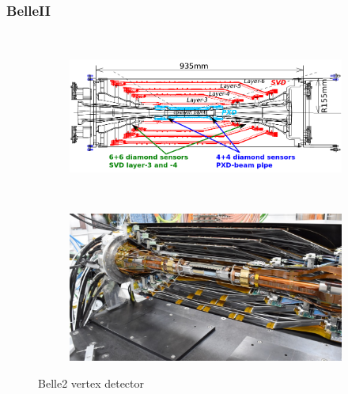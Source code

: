         \subsubsection{BelleII}
        \
        \begin{figure}        
        \begin{subfigure}[b]{1.\textwidth}
            \centering
            \includegraphics[width=0.6\linewidth]{figures/pixel_detectors_usage/SVD_Belle2.png}      
            \caption{}
            \label{fig:Belle2_scheme}
        \end{subfigure}\\
            \centering
            \begin{subfigure}[b]{1.\textwidth}
                \centering
                \includegraphics[width=0.65\linewidth]{figures/pixel_detectors_usage/Belle2_vertex.png}
                \caption{}
                \label{fig:Belle2_photo}
            \end{subfigure}
            \caption{Belle2 vertex detector}
            \label{fig:Belle2_Vertex}
       \end{figure}

